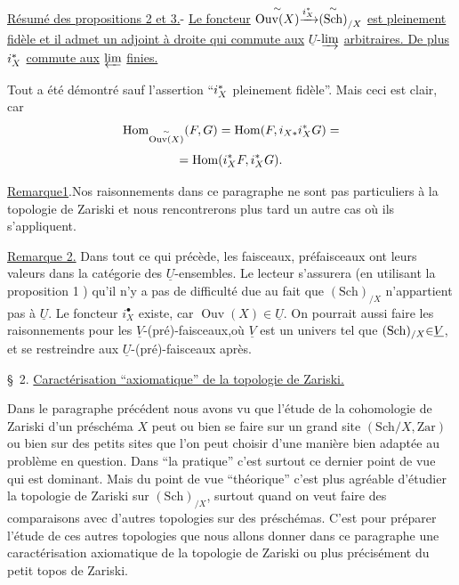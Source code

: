 \uline{Résumé des propositions 2 et 3.}- \uline{Le foncteur}
$\overset{{\sim}}{\operatorname{Ouv}(X)}{\xrightarrow{i_X^*}}\overset{{\sim}}{(\mathrm{Sch})}_{/X}$
\uline{est pleinement fidèle et il admet un adjoint à droite qui commute aux} $\underline{U}$-$\varinjlim$ \uline{arbitraires. De plus} $i_X^{{*}}$ \uline{commute aux} $\varprojlim$ \uline{finies.}

Tout a été démontré sauf l'assertion ``$i_X^{{*}}$ pleinement fidèle''.
Mais ceci est clair, car
\[
\operatorname{Hom}_{\overset{{\sim}}{\operatorname{Ouv}(X)}}(F,G)=\operatorname{Hom}(F,i_{X{*}}i_X^{{*}}G)=
\]
\[
=\operatorname{Hom}(i_X^{{*}}F,i_X^{{*}}G).
\]

\uline{Remarque1}.Nos raisonnements dans ce paragraphe ne sont pas particuliers à la topologie de Zariski et nous rencontrerons plus tard un autre cas où ils s'appliquent.

\uline{Remarque 2.} Dans tout ce qui précède, les faisceaux, préfaisceaux ont leurs valeurs dans la catégorie des $\underline{U}$-ensembles. Le lecteur s'assurera (en utilisant la proposition 1 ) qu'il n'y a pas de difficulté due au fait que $(\mathrm{Sch})_{/X}$ n'appartient pas à $\underline{U}$. Le foncteur $i_X^\bullet$ existe, car $\operatorname{Ouv}(X)\in\underline{U}$. On pourrait aussi faire les raisonnements pour les $\underline{V}$-(pré)-faisceaux,où $\underline{V}$ est un univers tel que $(\mathrm{Sch})_{/X}{\in}\underline{V}$, et se restreindre aux $\underline{U}$-(pré)-faisceaux après.

\S\ 2. \uline{Caractérisation ``axiomatique'' de la topologie de Zariski.}

Dans le paragraphe précédent nous avons vu que l'étude de la cohomologie de Zariski d'un préschéma $X$ peut ou bien se faire sur un grand site $(\mathrm{Sch}/X,\mathrm{Zar})$ ou bien sur des petits sites que l'on peut choisir d'une manière bien adaptée au problème en question. Dans ``la pratique'' c'est surtout ce dernier point de vue qui est dominant. Mais du point de vue ``théorique'' c'est plus agréable d'étudier la topologie de Zariski sur $(\mathrm{Sch})_{/X}$, surtout quand on veut faire des comparaisons avec d'autres topologies sur des préschémas. C'est pour préparer l'étude de ces autres topologies que nous allons donner dans ce paragraphe une caractérisation axiomatique de la topologie de Zariski ou plus précisément du petit topos de Zariski.

